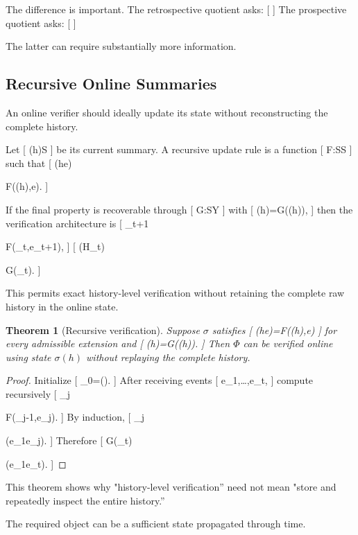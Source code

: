 \documentclass[11pt]{article}
\newtheorem{theorem}{Theorem} \newtheorem{proposition}{Proposition} \newtheorem{lemma}{Lemma} \newtheorem{corollary}{Corollary} \newtheorem{definition}{Definition} \newtheorem{remark}{Remark}
\begin{document}
The difference is important. The retrospective quotient asks:
[
]
The prospective quotient asks:
[
]

The latter can require substantially more information.

\subsection{Recursive Online Summaries}

An online verifier should ideally update its state without reconstructing the complete history.

Let
[
\sigma(h)\in\mathcal S
]
be its current summary. A recursive update rule is a function
[
F:\mathcal S\times\Sigma\to\mathcal S
]
such that
[
\sigma(he)

F(\sigma(h),e).
]

If the final property is recoverable through
[
G:\mathcal S\to\mathcal Y
]
with
[
\Phi(h)=G(\sigma(h)),
]
then the verification architecture is
[
\sigma_{t+1}

F(\sigma_t,e_{t+1}),
]
[
\Phi(H_{\leq t})

G(\sigma_t).
]

This permits exact history-level verification without retaining the complete raw history in the online state.

\begin{theorem}[Recursive verification]
Suppose $\sigma$ satisfies
[
\sigma(he)=F(\sigma(h),e)
]
for every admissible extension and
[
\Phi(h)=G(\sigma(h)).
]
Then $\Phi$ can be verified online using state $\sigma(h)$ without replaying the complete history.
\end{theorem}

\begin{proof}
Initialize
[
\sigma_0=\sigma(\epsilon).
]
After receiving events
[
e_1,\ldots,e_t,
]
compute recursively
[
\sigma_j

F(\sigma_{j-1},e_j).
]
By induction,
[
\sigma_j

\sigma(e_1\cdots e_j).
]
Therefore
[
G(\sigma_t)

\Phi(e_1\cdots e_t).
]
\end{proof}

This theorem shows why "history-level verification'' need not mean "store and repeatedly inspect the entire history.''

The required object can be a sufficient state propagated through time.
\end{document}
